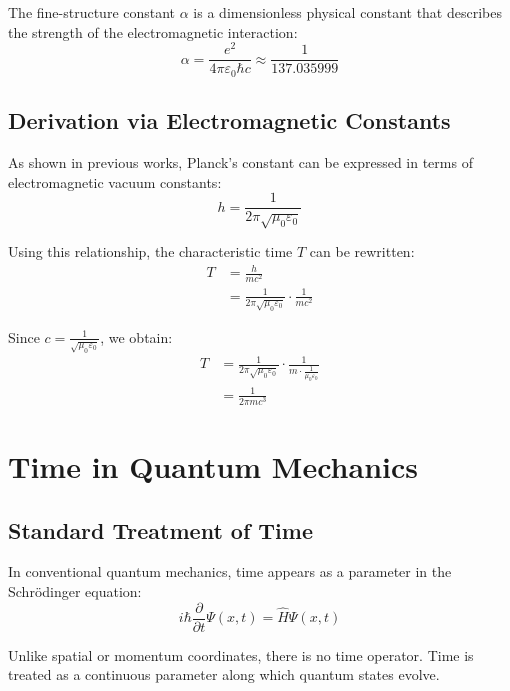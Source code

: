 \documentclass{article}
\begin{document}
	The fine-structure constant $\alpha$ is a dimensionless physical constant that describes the strength of the electromagnetic interaction:
	\begin{equation}
		\alpha = \frac{e^2}{4\pi\varepsilon_0\hbar c} \approx \frac{1}{137.035999}
	\end{equation}
	
	\subsection{Derivation via Electromagnetic Constants}
	
	As shown in previous works, Planck’s constant can be expressed in terms of electromagnetic vacuum constants:
	\begin{equation}
		h = \frac{1}{2\pi\sqrt{\mu_0\varepsilon_0}}
	\end{equation}
	
	Using this relationship, the characteristic time $T$ can be rewritten:
	\begin{align}
		T &= \frac{h}{mc^2} \\
		&= \frac{1}{2\pi\sqrt{\mu_0\varepsilon_0}} \cdot \frac{1}{mc^2}
	\end{align}
	
	Since $c = \frac{1}{\sqrt{\mu_0\varepsilon_0}}$, we obtain:
	\begin{align}
		T &= \frac{1}{2\pi\sqrt{\mu_0\varepsilon_0}} \cdot \frac{1}{m \cdot \frac{1}{\mu_0\varepsilon_0}} \\
		&= \frac{1}{2\pi m c^3}
	\end{align}
	
	\section{Time in Quantum Mechanics}
	
	\subsection{Standard Treatment of Time}
	
	In conventional quantum mechanics, time appears as a parameter in the Schrödinger equation:
	\begin{equation}
		i\hbar \frac{\partial}{\partial t}\Psi(x,t) = \hat{H}\Psi(x,t)
	\end{equation}
	
	Unlike spatial or momentum coordinates, there is no time operator. Time is treated as a continuous parameter along which quantum states evolve.
	
\end{document}
